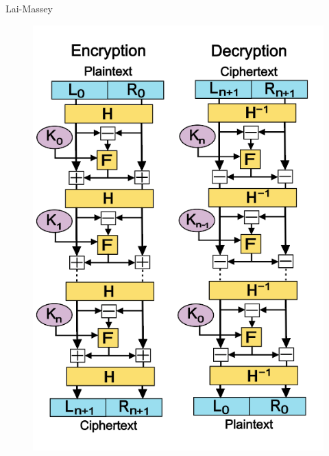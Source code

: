 \documentclass{beamer}
\begin{document}
\begin{frame}{Lai-Massey}
	\begin{figure}[h!]
		\centering
		\includegraphics[width=\textwidth,height=0.8\textheight,keepaspectratio]{lai-massey}
	\end{figure}
\end{frame}

\begin{frame}
\end{frame}
\end{document}
